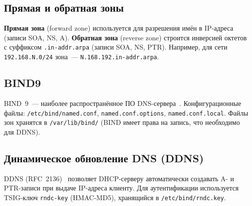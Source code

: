 \subsection{Прямая и обратная зоны}

\textbf{Прямая зона} (forward zone) используется для разрешения имён в IP-адреса (записи SOA, NS, A). \textbf{Обратная зона} (reverse zone) строится инверсией октетов с суффиксом \texttt{.in-addr.arpa} (записи SOA, NS, PTR). Например, для сети \texttt{192.168.N.0/24} зона~--- \texttt{N.168.192.in-addr.arpa}.

\subsection{BIND9}

BIND~9~--- наиболее распространённое ПО DNS-сервера~\cite{bind9_admin}. Конфигурационные файлы: \texttt{/etc/bind/named.conf}, \texttt{named.conf.options}, \texttt{named.conf.local}. Файлы зон хранятся в \texttt{/var/lib/bind/} (BIND имеет права на запись, что необходимо для DDNS).

\subsection{Динамическое обновление DNS (DDNS)}

DDNS (RFC~2136)~\cite{rfc2136} позволяет DHCP-серверу автоматически создавать A- и PTR-записи при выдаче IP-адреса клиенту. Для аутентификации используется TSIG-ключ \texttt{rndc-key} (HMAC-MD5), хранящийся в \texttt{/etc/bind/rndc.key}.
